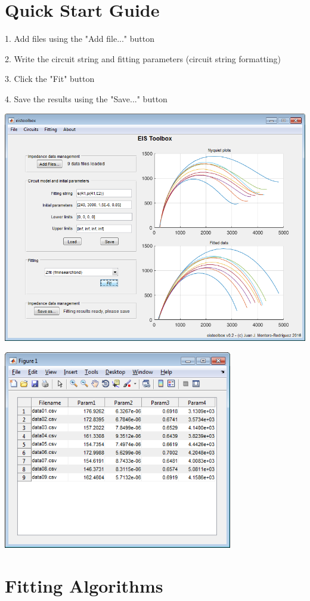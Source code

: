 \documentclass[10pt,a4paper,oneside]{book}
\begin{document}
\chapter{Quick Start Guide}

1. Add files using the "Add file..." button

2. Write the circuit string and fitting parameters (circuit string formatting)

3. Click the "Fit" button

4. Save the results using the "Save..." button

\includegraphics[width=15cm]{main_screenshot.png}

\includegraphics[width=10cm]{scr_results.png}


\chapter{Fitting Algorithms}
\end{document}
